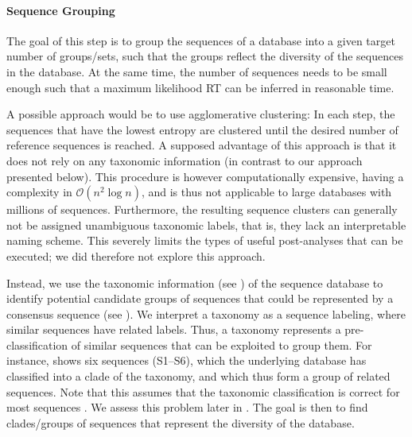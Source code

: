 
\paragraph{Sequence Grouping}
\label{ch:AutomaticTrees:sec:Methods:sub:PhAT:par:SequenceGrouping}

The goal of this step is to group the sequences of a database into a given target number of groups/sets,
such that the groups reflect the diversity of the sequences in the database.
At the same time, the number of sequences needs to be small enough
such that a maximum likelihood \ac{RT} can be inferred in reasonable time.

A possible approach would be to use agglomerative clustering:
In each step, the sequences that have the lowest entropy are clustered
until the desired number of reference sequences is reached.
A supposed advantage of this approach is that it does not rely on any taxonomic information
(in contrast to our approach presented below).
This procedure is however computationally expensive, having a complexity in $\mathcal{O}(n^2\log n)$,
and is thus not applicable to large databases with millions of sequences.
Furthermore, the resulting sequence clusters can generally not be assigned unambiguous taxonomic labels,
that is, they lack an interpretable naming scheme.
This severely limits the types of useful post-analyses that can be executed;
we did therefore not explore this approach.

Instead, we use the taxonomic information (see )
of the sequence database to identify potential candidate groups of sequences
that could be represented by a consensus sequence (see ).
We interpret a taxonomy as a sequence labeling, where similar sequences have related labels.
Thus, a taxonomy represents a pre-classification of similar sequences that can be exploited to group them.
For instance,  shows six sequences (S1--S6),
which the underlying database has classified into a clade of the taxonomy,
and which thus form a group of related sequences.
Note that this assumes that the taxonomic classification is correct for most sequences \cite{Kozlov2016}.
We assess this problem later in .
The goal is then to find clades/groups of sequences that represent the diversity of the database.

